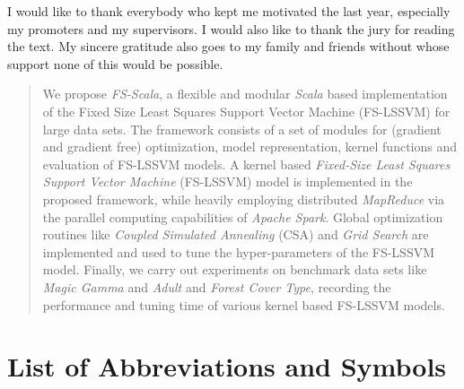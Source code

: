 \documentclass[master=mai,masteroption=ecs]{kulemt}
\begin{document}
\begin{preface}
  I would like to thank everybody who kept me motivated the last year,
  especially my promoters and my supervisors. I would also like to thank the
  jury for reading the text. My sincere gratitude also goes to my family and friends 
  without whose support none of this would be possible.
\end{preface}

\tableofcontents*

\begin{abstract}
We propose \textit{FS-Scala}, a flexible and modular \textit{Scala} based implementation of the Fixed Size Least Squares Support Vector Machine (FS-LSSVM) for large data sets. The framework consists of a set of modules for (gradient and gradient free) optimization, model representation, kernel functions and evaluation of FS-LSSVM models. A kernel based \textit{Fixed-Size Least Squares Support Vector Machine} (FS-LSSVM) model is implemented in the proposed framework, while heavily employing distributed \textit{MapReduce} via the parallel computing capabilities of \textit{Apache Spark}. Global optimization routines like \emph{Coupled Simulated Annealing} (CSA) and \emph{Grid Search} are implemented and used to tune the hyper-parameters of the FS-LSSVM model. Finally, we carry out experiments on benchmark data sets like \emph{Magic Gamma} and \emph{Adult} and \emph{Forest Cover Type}, recording the performance and tuning time of various kernel based FS-LSSVM models.
\end{abstract}

\listoffiguresandtables
\chapter{List of Abbreviations and Symbols}
\end{document}
